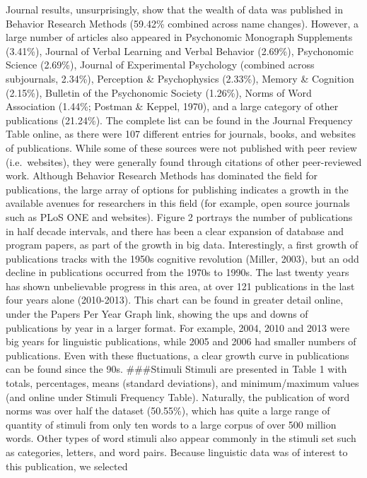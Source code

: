 \documentclass[english,man]{apa6}
\theoremstyle{definition}
\theoremstyle{definition}
\theoremstyle{definition}
\theoremstyle{remark}
\begin{document}
Journal results, unsurprisingly, show that the wealth of data was
published in Behavior Research Methods (59.42\% combined across name
changes). However, a large number of articles also appeared in
Psychonomic Monograph Supplements (3.41\%), Journal of Verbal Learning
and Verbal Behavior (2.69\%), Psychonomic Science (2.69\%), Journal of
Experimental Psychology (combined across subjournals, 2.34\%),
Perception \& Psychophysics (2.33\%), Memory \& Cognition (2.15\%),
Bulletin of the Psychonomic Society (1.26\%), Norms of Word Association
(1.44\%; Postman \& Keppel, 1970), and a large category of other
publications (21.24\%). The complete list can be found in the Journal
Frequency Table online, as there were 107 different entries for
journals, books, and websites of publications. While some of these
sources were not published with peer review (i.e.~websites), they were
generally found through citations of other peer-reviewed work. Although
Behavior Research Methods has dominated the field for publications, the
large array of options for publishing indicates a growth in the
available avenues for researchers in this field (for example, open
source journals such as PLoS ONE and websites). Figure 2 portrays the
number of publications in half decade intervals, and there has been a
clear expansion of database and program papers, as part of the growth in
big data. Interestingly, a first growth of publications tracks with the
1950s cognitive revolution (Miller, 2003), but an odd decline in
publications occurred from the 1970s to 1990s. The last twenty years has
shown unbelievable progress in this area, at over 121 publications in
the last four years alone (2010-2013). This chart can be found in
greater detail online, under the Papers Per Year Graph link, showing the
ups and downs of publications by year in a larger format. For example,
2004, 2010 and 2013 were big years for linguistic publications, while
2005 and 2006 had smaller numbers of publications. Even with these
fluctuations, a clear growth curve in publications can be found since
the 90s. \#\#\#Stimuli Stimuli are presented in Table 1 with totals,
percentages, means (standard deviations), and minimum/maximum values
(and online under Stimuli Frequency Table). Naturally, the publication
of word norms was over half the dataset (50.55\%), which has quite a
large range of quantity of stimuli from only ten words to a large corpus
of over 500 million words. Other types of word stimuli also appear
commonly in the stimuli set such as categories, letters, and word pairs.
Because linguistic data was of interest to this publication, we selected
\end{document}

